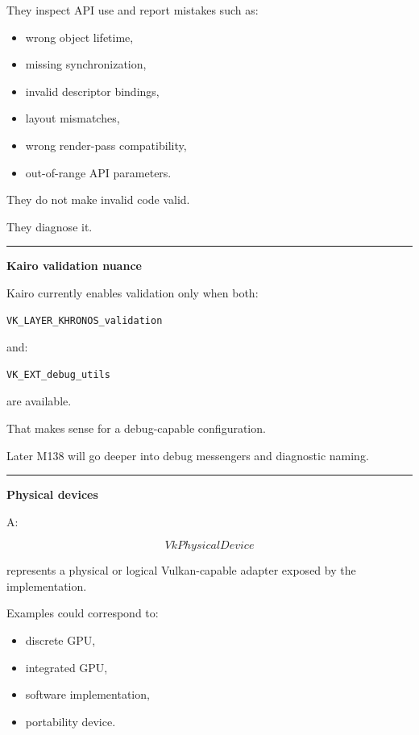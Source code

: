 They inspect API use and report mistakes such as:

\begin{itemize}
\tightlist
\item
  wrong object lifetime,
\item
  missing synchronization,
\item
  invalid descriptor bindings,
\item
  layout mismatches,
\item
  wrong render-pass compatibility,
\item
  out-of-range API parameters.
\end{itemize}

They do not make invalid code valid.

They diagnose it.

\begin{center}\rule{0.5\linewidth}{0.5pt}\end{center}

\textbf{Kairo validation nuance}

Kairo currently enables validation only when both:

\begin{verbatim}
VK_LAYER_KHRONOS_validation
\end{verbatim}

and:

\begin{verbatim}
VK_EXT_debug_utils
\end{verbatim}

are available.

That makes sense for a debug-capable configuration.

Later M138 will go deeper into debug messengers and diagnostic naming.

\begin{center}\rule{0.5\linewidth}{0.5pt}\end{center}

\textbf{Physical devices}

A:

\[
VkPhysicalDevice
\]

represents a physical or logical Vulkan-capable adapter exposed by the implementation.

Examples could correspond to:

\begin{itemize}
\tightlist
\item
  discrete GPU,
\item
  integrated GPU,
\item
  software implementation,
\item
  portability device.
\end{itemize}

